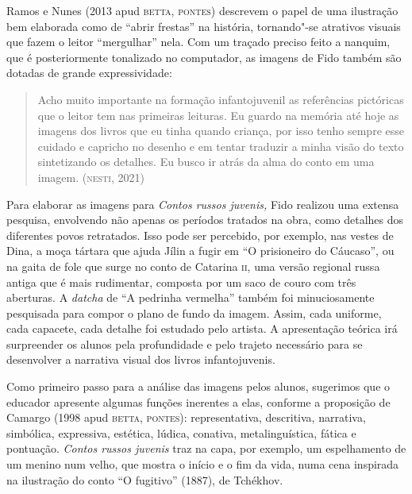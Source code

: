 \documentclass[11pt]{extarticle}
\begin{document}
Ramos e Nunes (2013 apud \textsc{betta}, \textsc{pontes}) descrevem o papel de uma
ilustração bem elaborada como de ``abrir frestas'' na história,
tornando"-se atrativos visuais que fazem o leitor ``mergulhar'' nela. Com
um traçado preciso feito a nanquim, que é posteriormente tonalizado no
computador, as imagens de Fido também são dotadas de grande
expressividade:

\begin{quote}
Acho muito importante na formação infantojuvenil as referências
pictóricas que o leitor tem nas primeiras leituras. Eu guardo na memória
até hoje as imagens dos livros que eu tinha quando criança, por isso
tenho sempre esse cuidado e capricho no desenho e em tentar traduzir a
minha visão do texto sintetizando os detalhes. Eu busco ir atrás da alma
do conto em uma imagem. (\textsc{nesti}, 2021)
\end{quote}

Para elaborar as imagens para \emph{Contos russos juvenis,} Fido
realizou uma extensa pesquisa, envolvendo não apenas os períodos
tratados na obra, como detalhes dos diferentes povos retratados. Isso
pode ser percebido, por exemplo, nas vestes de Dina, a moça tártara que
ajuda Jílin a fugir em ``O prisioneiro do Cáucaso'', ou na gaita
de fole que surge no conto de Catarina \textsc{ii}, uma versão regional russa
antiga que é mais rudimentar, composta por um saco de couro com três
aberturas. A \emph{datcha} de ``A pedrinha vermelha'' também foi
minuciosamente pesquisada para compor o plano de fundo da imagem. Assim,
cada uniforme, cada capacete, cada detalhe foi estudado pelo artista. A
apresentação teórica irá surpreender os alunos pela profundidade e pelo
trajeto necessário para se desenvolver a narrativa visual dos livros
infantojuvenis.

\begin{figure}[ht!]
\end{figure}

Como primeiro passo para a análise das imagens pelos alunos, sugerimos
que o educador apresente algumas funções inerentes a elas, conforme a
proposição de Camargo (1998 apud \textsc{betta}, \textsc{pontes}): representativa,
descritiva, narrativa, simbólica, expressiva, estética, lúdica,
conativa, metalinguística, fática e pontuação. \emph{Contos russos
juvenis} traz na capa, por exemplo, um espelhamento de um menino num
velho, que mostra o início e o fim da vida, numa cena inspirada na
ilustração do conto ``O fugitivo'' (1887), de Tchékhov.
\end{document}
